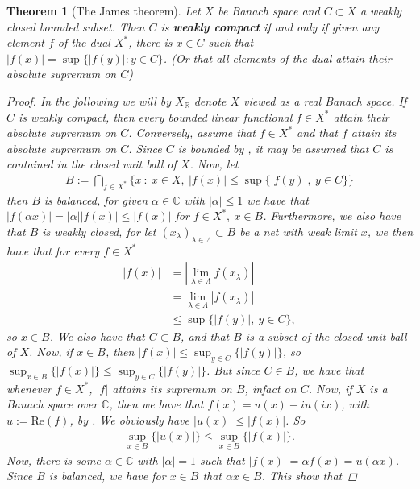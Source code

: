\documentclass[10pt,twoside,openany,final]{memoir}
\theoremstyle{break}
\newtheorem{theorem}[section]{Theorem}
\theoremstyle{Break}
\newcommand{\R}{\mathbb{R}}
\newcommand{\C}{\mathbb{C}}
\begin{document}
\begin{theorem}[The James theorem]\label{PRYCE}
Let $X$ be Banach space and $C \subset X$ a weakly closed bounded subset. Then $C$ is \textbf{weakly compact} if and only if given any element $f$ of the dual $X^*$, there is $x \in C$ such that $|f(x)|=\sup\{|f(y)|: y \in C\}$. \textit{(Or that all elements of the dual attain their absolute supremum on $C$)}
\begin{proof}
In the following we will by $X_{\R}$ denote $X$ viewed as a real Banach space. If $C$ is weakly compact, then every bounded linear functional $f \in X^*$ attain their absolute supremum on $C$. Conversely, assume that $f \in X^*$ and that $f$ attain its absolute supremum on $C$. Since $C$ is bounded by , it may be assumed that $C$ is contained in the closed unit ball of $X$. Now, let
\begin{align*}
B:=\bigcap_{f \in X^*} \{ x\ : \ x \in X,\ |f(x)| \leq \sup\{ |f(y)|, \ y \in C \} \}
\end{align*}
then $B$ is balanced, for given $\alpha \in \C$ with $|\alpha| \leq 1$ we have that $|f(\alpha x)| = |\alpha| |f(x)| \leq |f(x)|$ for $f \in X^*, \ x \in B$. Furthermore, we also have that $B$ is weakly closed, for let $(x_{\lambda})_{\lambda \in \Lambda} \subset B$ be a net with weak limit $x$, we then have that for every $f \in X^*$
\begin{align*}
|f(x)| &= |\lim_{\lambda \in \Lambda} f(x_{\lambda})| \\
&= \lim_{\lambda \in \Lambda} |f(x_{\lambda})| \\
&\leq \sup \{ |f(y)|, \ y \in C \},
\end{align*}
so $x \in B$. We also have that $C \subset B$, and that $B$ is a subset of the closed unit ball of $X$. Now, if $x \in B$, then $\displaystyle |f(x)| \leq \sup_{y \in C} \{ |f(y)| \}$, so $\displaystyle \sup_{x \in B} \{ |f(x)|\} \leq \sup_{y \in C} \{|f(y)|\}$. But since $C \in B$, we have that whenever $f \in X^*$, $|f|$ attains its supremum on $B$, infact on $C$. Now, if $X$ is a Banach space over $\C$, then we have that $f(x)=u(x)-iu(ix)$, with $u:=\text{Re}(f)$, by  . We obviously have $|u(x)| \leq |f(x)|$. So 
\begin{align*}
\sup_{x \in B} \{ |u(x)| \} \leq \sup_{x \in B} \{ |f(x)| \}.
\end{align*}
Now, there is some $\alpha \in \C$ with $|\alpha| =1$ such that $|f(x)|=\alpha f(x)=u(\alpha x)$. Since $B$ is balanced, we have for $x \in B$ that $\alpha x \in B$. This show that

\end{proof}
\end{theorem}
\end{document}

